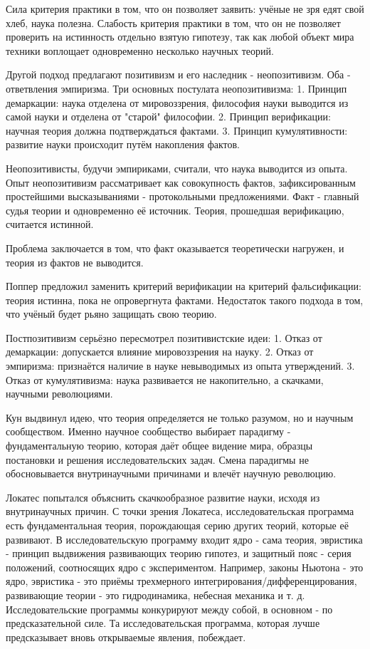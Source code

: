 \documentclass[a4paper, 12pt]{article}
\begin{document}
Сила критерия практики в том, что он позволяет заявить: учёные не зря едят свой хлеб, наука полезна.
Слабость критерия практики в том, что он не позволяет проверить на истинность отдельно взятую гипотезу, так как любой объект мира техники воплощает одновременно несколько научных теорий.

Другой подход предлагают позитивизм и его наследник - неопозитивизм.
Оба - ответвления эмпиризма.
Три основных постулата неопозитивизма:
1. Принцип демаркации: наука отделена от мировоззрения, философия науки выводится из самой науки и отделена от "старой" философии.
2. Принцип верификации: научная теория должна подтверждаться фактами.
3. Принцип кумулятивности: развитие науки происходит путём накопления фактов.

Неопозитивисты, будучи эмпириками, считали, что наука выводится из опыта.
Опыт неопозитивизм рассматривает как совокупность фактов, зафиксированным простейшими высказываниями - протокольными предложениями.
Факт - главный судья теории и одновременно её источник.
Теория, прошедшая верификацию, считается истинной.

Проблема заключается в том, что факт оказывается теоретически нагружен, и теория из фактов не выводится.

Поппер предложил заменить критерий верификации на критерий фальсификации: теория истинна, пока не опровергнута фактами.
Недостаток такого подхода в том, что учёный будет рьяно защищать свою теорию.

Постпозитивизм серьёзно пересмотрел позитивистские идеи:
1. Отказ от демаркации: допускается влияние мировоззрения на науку.
2. Отказ от эмпиризма: признаётся наличие в науке невыводимых из опыта утверждений.
3. Отказ от кумулятивизма: наука развивается не накопительно, а скачками, научными революциями.

Кун выдвинул идею, что теория определяется не только разумом, но и научным сообществом.
Именно научное сообщество выбирает парадигму - фундаментальную теорию, которая даёт общее видение мира, образцы постановки и решения исследовательских задач.
Смена парадигмы не обосновывается внутринаучными причинами и влечёт научную революцию.

Локатес попытался объяснить скачкообразное развитие науки, исходя из внутринаучных причин.
С точки зрения Локатеса, исследовательская программа есть фундаментальная теория, порождающая серию других теорий, которые её развивают.
В исследовательскую программу входит ядро - сама теория, эвристика - принцип выдвижения развивающих теорию гипотез, и защитный пояс - серия положений, соотносящих ядро с экспериментом.
Например, законы Ньютона - это ядро, эвристика - это приёмы трехмерного интегрирования/дифференцирования, развивающие теории - это гидродинамика, небесная механика и т. д.
Исследовательские программы конкурируют между собой, в основном - по предсказательной силе.
Та исследовательская программа, которая лучше предсказывает вновь открываемые явления, побеждает.
\end{document}
